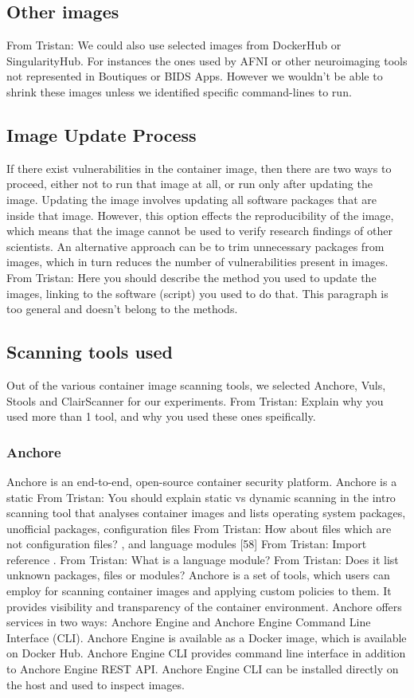 \documentclass[a4paper,num-refs]{oup-contemporary}
\newcommand{\TG}[1]{\color{blue}From Tristan: #1 \color{black}}
\begin{document}
\subsection{Other images}

\TG{We could also use selected images from DockerHub or SingularityHub. For
instances the ones used by AFNI or other neuroimaging tools not represented
in Boutiques or BIDS Apps. However we wouldn't be able to shrink these
images unless we identified specific command-lines to run.}

\subsection{Image Update Process}

If there exist vulnerabilities in the container image, then there are two ways
to proceed, either not to run that image at all, or run only after updating the
image. Updating the image involves updating all software packages that are
inside that image. However, this option effects the reproducibility
of the image, which means that the image cannot be used to verify research
findings of other scientists. An alternative approach can be to trim unnecessary
packages from images, which in turn reduces the number of vulnerabilities
present in images. \TG{Here you should describe the method you used to update the images, linking to the 
software (script) you used to do that. 
This paragraph is too general and doesn't belong to the methods. }


\subsection{Scanning tools used}

Out of the various container image scanning tools, we selected Anchore,
Vuls, Stools and ClairScanner for our experiments. \TG{Explain why you used
more than 1 tool, and why you used these ones speifically.}

\subsubsection{Anchore}

Anchore is an end-to-end, open-source container security platform. Anchore
is a static \TG{You should explain static vs dynamic scanning in the intro}
scanning tool that analyses container images and lists operating system
packages, unofficial packages, configuration files \TG{How about files
which are not configuration files?}, and language modules [58] \TG{Import
reference}. \TG{What is a language module?} \TG{Does it list unknown
packages, files or modules?} Anchore is a set of tools, which users can
employ for scanning container images and applying custom policies to them.
It provides visibility and transparency of the container environment.
Anchore offers services in two ways: Anchore Engine and Anchore Engine
Command Line Interface (CLI). Anchore Engine is available as a Docker
image, which is available on Docker Hub. Anchore Engine CLI provides
command line interface in addition to Anchore Engine REST API. Anchore
Engine CLI can be installed directly on the host and used to inspect
images.
\end{document}
